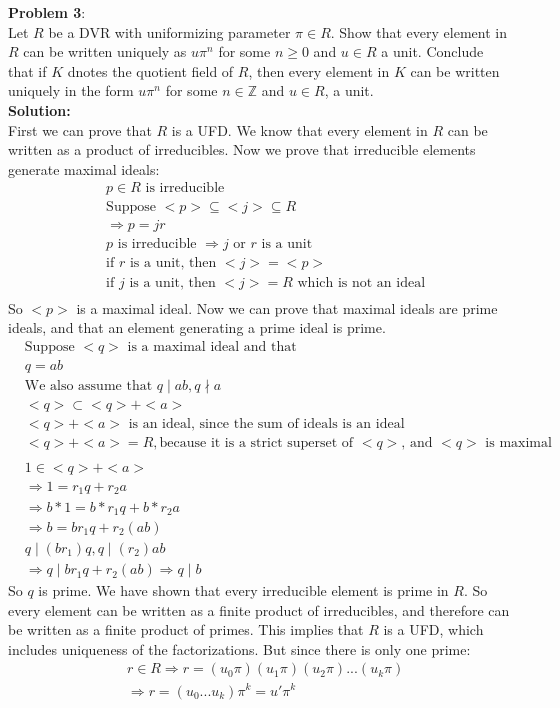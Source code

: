 \documentclass[11pt]{article}
\newcommand{\prob}[3]{\begin{flushleft}
        \textbf{Problem #1}: \\
        #2 
		\textbf{Solution:} 
		#3

\end{flushleft}}
\begin{document}
\prob{3}{
  Let $R$ be a DVR with uniformizing parameter $\pi \in R$. Show that every element in $R$ can be written uniquely as $u\pi^n$ for some $n \geq 0$ and $u \in R$ a unit.
  Conclude that if $K$ dnotes the quotient field of $R$, then every element in $K$ can be written uniquely in the form $u \pi^n$ for some $n \in \mathbb{Z}$ and $u \in R$, a unit. \\
}{ \\
  First we can prove that $R$ is a UFD. We know that every element in $R$ can be written as a product of irreducibles. Now we prove that irreducible elements generate maximal ideals:
\begin{align*}
&p \in R \text{ is irreducible}\\
&\text{Suppose } <p> \subseteq <j> \subseteq R\\
&\Rightarrow p = jr\\
&\text{$p$ is irreducible } \Rightarrow \text{$j $ or $r$ is a unit}\\
&\text{if $r$ is a unit, then } <j> = <p>\\
&\text{if $j$ is a unit, then } <j> = R \text{ which is not an ideal}\\
\end{align*}
So $<p>$ is a maximal ideal.
Now we can prove that maximal ideals are prime ideals, and that an element generating a prime ideal is prime.
\begin{align*}
&\text{Suppose $<q>$ is a maximal ideal and that }\\
&q = ab\\
&\text{We also assume that $q \mid ab, q \nmid a$}\\
&<q> \subset <q> + <a>\\
&<q> + <a> \text{ is an ideal, since the sum of ideals is an ideal}\\
&<q> + <a> = R, \text{because it is a strict superset of $<q>$, and $<q>$ is maximal}\\
&\\
&1 \in <q> + <a>\\
&\Rightarrow 1 = r_1q + r_2a\\
&\Rightarrow b*1 = b*r_1q + b*r_2a\\
&\Rightarrow b = br_1q + r_2(ab)\\
&q \mid (br_1)q, q \mid (r_2)ab\\
&\Rightarrow q \mid br_1q + r_2(ab) \Rightarrow q \mid b
\end{align*}
So $q$ is prime. We have shown that every irreducible element is prime in $R$. So every element can be written as a finite product of irreducibles, and therefore can be written as a finite product of primes. This implies that $R$ is a UFD, which includes uniqueness of the factorizations. But since there is only one prime:
\begin{align*}
&r \in R \Rightarrow r = (u_0\pi)(u_1\pi)(u_2\pi)...(u_k\pi)\\
&\Rightarrow r = (u_0...u_k)\pi^k = u'\pi^k\\
\end{align*}

}
\end{document}

